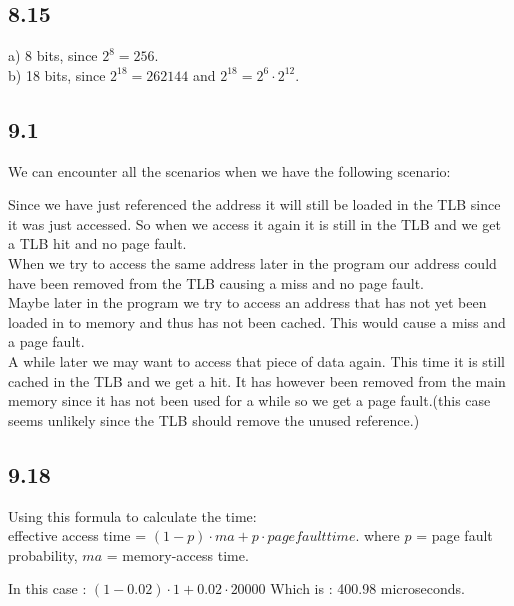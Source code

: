 \documentclass[]{article}
\begin{document}
\subsection*{8.15}

a) 8 bits, since $2^8 = 256$.\\
b) 18 bits, since $2^{18} = 262144$ and $2^{18} = 2^{6} \cdot 2^{12}$.\\

\subsection*{9.1}

We can encounter all the scenarios when we have the following scenario:

Since we have just referenced the address it will still be loaded in the TLB since it was just accessed. So when we access it again it is still in the TLB and we get a TLB hit and no page fault.\\
When we try to access the same address later in the program our address could have been removed from the TLB causing a miss and no page fault.\\
Maybe later in the program we try to access an address that has not yet been loaded in to memory and thus has not been cached. This would cause a miss and a page fault.\\
A while later we may want to access that piece of data again. This time it is still cached in the TLB and we get a hit. It has however been removed from the main memory since it has not been used for a while so we get a page fault.(this case seems unlikely since the TLB should remove the unused reference.)\\

\subsection*{9.18}

Using this formula to calculate the time:\\
effective access time = $(1 - p) \cdot ma + p \cdot page fault time$.
where $p$ = page fault probability, $ma$ = memory-access time.

In this case : $(1 - 0.02) \cdot 1 + 0.02 \cdot 20000$
Which is : 400.98 microseconds.
\end{document}

